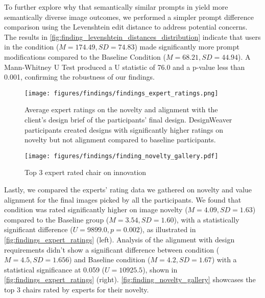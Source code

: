 To further explore why that semantically similar prompts in \toolname{} yield more semantically diverse image outcomes, we performed a simpler prompt difference comparison using the Levenshtein edit distance to address potential concerns. The results in \autoref{fig:finding_levenshtein_distances_distribution} indicate that users in the \toolname{} condition ($M=174.49, SD=74.83$) made significantly more prompt modifications compared to the Baseline Condition ($M=68.21, SD=44.94$). A Mann-Whitney U Test produced a U statistic of 76.0 and a p-value less than 0.001, confirming the robustness of our findings.

\begin{figure*}[htbp]
    \centering
    \texttt{[image: figures/findings/findings\_expert\_ratings.png]}
    \caption{Average expert ratings on the novelty and alignment with the client's design brief of the participants' final design. DesignWeaver participants created designs with significantly higher ratings on novelty but not alignment compared to baseline participants.}
    \label{fig:findings_expert_ratings}
\end{figure*}

\begin{figure}[htbp]
    \centering
    \texttt{[image: figures/findings/finding\_novelty\_gallery.pdf]}
    \caption{Top 3 expert rated chair on innovation}
    \label{fig:finding_novelty_gallery}
\end{figure}

Lastly, we compared the experts' rating data we gathered on novelty and value alignment for the final images picked by all the participants. We found that \toolname{} condition was rated significantly higher on image novelty ($M=4.09, SD=1.63$) compared to the Baseline group ($M=3.54, SD=1.60$), with a statistically significant difference ($U=9899.0, p=0.002$), as illustrated in \autoref{fig:findings_expert_ratings} (left). Analysis of the alignment with design requirements didn't show a significant difference between \toolname{} condition ($M=4.5, SD=1.656$) and Baseline condition ($M=4.2, SD=1.67$) with a statistical significance at 0.059 ($U = 10925.5$), shown in \autoref{fig:findings_expert_ratings} (right). \autoref{fig:finding_novelty_gallery} showcases the top 3 chairs rated by experts for their novelty.



